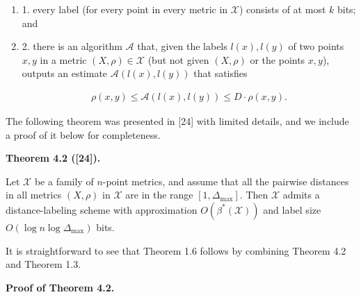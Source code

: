 \par
\begin{enumerate}
\item[]  1. 
every label (for every point in every metric in $\mathcal{X}$) consists of at most $k$ bits; and
\par
\par
\item[]  2. 
there is an algorithm $\mathcal{A}$ that, given the labels $l(x),l(y)$ of two points $x,y$ in a metric $(X,\rho)\in\mathcal{X}$ (but not given $(X,\rho)$ or the points $x,y$), outputs an estimate $\mathcal{A}(l(x),l(y))$ that satisfies
\par
\[\begin{aligned}
\rho(x,y)\leq\mathcal{A}(l(x),l(y))\leq D\cdot\rho(x,y).
\end{aligned}\]
\par
\end{enumerate}
\par
\par
The following theorem was presented in [24] with limited details, and we include a proof of it below for completeness.
\par
\par
\par\medskip\noindent\textbf{Theorem 4.2 ([24]).}\par
Let $\mathcal{X}$ be a family of $n$-point metrics, and assume that all the pairwise distances in all metrics $(X,\rho)$ in $\mathcal{X}$ are in the range $[1,\Delta_{\text{max}}]$. Then $\mathcal{X}$ admits a distance-labeling scheme with approximation $O(\beta^{*}(\mathcal{X}))$ and label size $O(\log n\log\Delta_{\max})$ bits.
\par
\par
\par
It is straightforward to see that Theorem 1.6 follows by combining Theorem 4.2 and Theorem 1.3.
\par
\par
\par\medskip\noindent\textbf{Proof of Theorem 4.2.}\par

